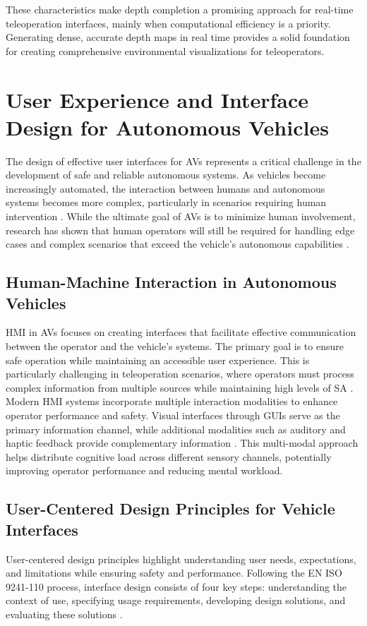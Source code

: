 These characteristics make depth completion a promising approach for real-time teleoperation interfaces, mainly when computational efficiency is a priority. Generating dense, accurate depth maps in real time provides a solid foundation for creating comprehensive environmental visualizations for teleoperators.

\section{User Experience and Interface Design for Autonomous Vehicles}
The design of effective user interfaces for \acp{AV} represents a critical challenge in the development of safe and reliable autonomous systems. As vehicles become increasingly automated, the interaction between humans and autonomous systems becomes more complex, particularly in scenarios requiring human intervention \cite{Kettwich}. While the ultimate goal of \acp{AV} is to minimize human involvement, research has shown that human operators will still be required for handling edge cases and complex scenarios that exceed the vehicle's autonomous capabilities \cite{mutzenich2021updating}.
\subsection{Human-Machine Interaction in Autonomous Vehicles}
\ac{HMI} in \acp{AV} focuses on creating interfaces that facilitate effective communication between the operator and the vehicle's systems. The primary goal is to ensure safe operation while maintaining an accessible user experience. This is particularly challenging in teleoperation scenarios, where operators must process complex information from multiple sources while maintaining high levels of \ac{SA} \cite{Georg}.
Modern HMI systems incorporate multiple interaction modalities to enhance operator performance and safety. Visual interfaces through \acp{GUI} serve as the primary information channel, while additional modalities such as auditory and haptic feedback provide complementary information \cite{kallioniemi2021enhancing}. This multi-modal approach helps distribute cognitive load across different sensory channels, potentially improving operator performance and reducing mental workload.
\subsection{User-Centered Design Principles for Vehicle Interfaces}
User-centered design principles highlight understanding user needs, expectations, and limitations while ensuring safety and performance. Following the EN ISO 9241-110 process, interface design consists of four key steps: understanding the context of use, specifying usage requirements, developing design solutions, and evaluating these solutions \cite{Georg}.

